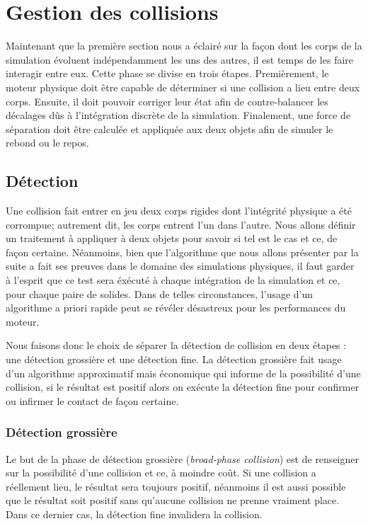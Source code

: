 \section{Gestion des collisions}

Maintenant que la première section nous a éclairé sur la façon dont
les corps de la simulation évoluent indépendamment les uns des autres,
il est temps de les faire interagir entre eux. Cette phase se divise
en trois étapes. Premièrement, le moteur physique doit être capable de
déterminer si une collision a lieu entre deux corps. Ensuite, il doit
pouvoir corriger leur état afin de contre-balancer les décalages dûs à
l'intégration discrète de la simulation. Finalement, une force de
séparation doit être calculée et appliquée aux deux objets afin de
simuler le rebond ou le repos.

\subsection{Détection}

Une collision fait entrer en jeu deux corps rigides dont l'intégrité
physique a été corrompue; autrement dit, les corps entrent l'un dans
l'autre. Nous allons définir un traitement à appliquer à deux objets
pour savoir si tel est le cas et ce, de façon certaine. Néanmoins,
bien que l'algorithme que nous allons présenter par la suite a fait
ses preuves dans le domaine des simulations physiques, il faut garder
à l'esprit que ce test sera éxécuté à chaque intégration de la
simulation et ce, pour chaque paire de solides. Dans de telles
circonstances, l'usage d'un algorithme a priori rapide peut se révéler
désastreux pour les performances du moteur.

Nous faisons donc le choix de séparer la détection de collision en
deux étapes : une détection grossière et une détection fine. La
détection grossière fait usage d'un algorithme approximatif mais
économique qui informe de la possibilité d'une collision, si le
résultat est positif alors on exécute la détection fine pour confirmer
ou infirmer le contact de façon certaine.

\subsubsection{Détection grossière}

Le but de la phase de détection grossière (\textit{broad-phase
  collision}) est de renseigner sur la possibilité d'une collision et
ce, à moindre coût. Si une collision a réellement lieu, le résultat
sera toujours positif, néanmoins il est aussi possible que le résultat
soit positif sans qu'aucune collision ne prenne vraiment place. Dans
ce dernier cas, la détection fine invalidera la collision.

